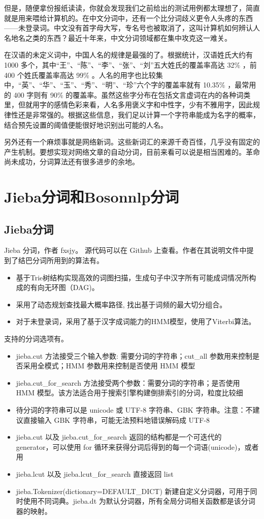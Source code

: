\documentclass[bachelor,winfonts]{jnuthesis}
\begin{document}
但是，随便拿份报纸读读，你就会发现我们之前给出的测试用例都太理想了，简直就是用来喂给计算机的。在中文分词中，还有一个比分词歧义更令人头疼的东西——未登录词。中文没有首字母大写，专名号也被取消了，这叫计算机如何辨认人名地名之类的东西？最近十年来，中文分词领域都在集中攻克这一难关。

在汉语的未定义词中，中国人名的规律是最强的了。根据统计，汉语姓氏大约有 1000 多个，其中“王”、“陈”、“李”、“张”、“刘”五大姓氏的覆盖率高达 32\% ，前 400 个姓氏覆盖率高达 99\% 。人名的用字也比较集中，“英”、“华”、“玉”、“秀”、“明”、“珍”六个字的覆盖率就有 10.35\% ，最常用的 400 字则有 90\% 的覆盖率。虽然这些字分布在包括文言虚词在内的各种词类里，但就用字的感情色彩来看，人名多用褒义字和中性字，少有不雅用字，因此规律性还是非常强的。根据这些信息，我们足以计算一个字符串能成为名字的概率，结合预先设置的阈值便能很好地识别出可能的人名。

另外还有一个麻烦事就是网络新词。这些新词汇的来源千奇百怪，几乎没有固定的产生机制。要想实现对网络文章的自动分词，目前来看可以说是相当困难的。革命尚未成功，分词算法还有很多进步的余地。

\section{Jieba分词和Bosonnlp分词}
\subsection{Jieba分词}

Jieba 分词\cite{jieba-github}，作者 fxsjy。 源代码可以在 Github 上查看。作者在其说明文件中提到了结巴分词所用到的算法有。

\begin{itemize}
\item 基于Trie树结构实现高效的词图扫描，生成句子中汉字所有可能成词情况所构成的有向无环图（DAG)。
\item 采用了动态规划查找最大概率路径, 找出基于词频的最大切分组合。
\item 对于未登录词，采用了基于汉字成词能力的HMM模型，使用了Viterbi算法。
\end{itemize}

支持的分词选项有。

\begin{itemize}
\item jieba.cut 方法接受三个输入参数: 需要分词的字符串；cut\_all 参数用来控制是否采用全模式；HMM 参数用来控制是否使用 HMM 模型
\item jieba.cut\_for\_search 方法接受两个参数：需要分词的字符串；是否使用 HMM 模型。该方法适合用于搜索引擎构建倒排索引的分词，粒度比较细
\item 待分词的字符串可以是 unicode 或 UTF-8 字符串、GBK 字符串。注意：不建议直接输入 GBK 字符串，可能无法预料地错误解码成 UTF-8
\item jieba.cut 以及 jieba.cut\_for\_search 返回的结构都是一个可迭代的 generator，可以使用 for 循环来获得分词后得到的每一个词语(unicode)，或者用
\item jieba.lcut 以及 jieba.lcut\_for\_search 直接返回 list
\item jieba.Tokenizer(dictionary=DEFAULT\_DICT) 新建自定义分词器，可用于同时使用不同词典。jieba.dt 为默认分词器，所有全局分词相关函数都是该分词器的映射。
\end{itemize}
\end{document}
